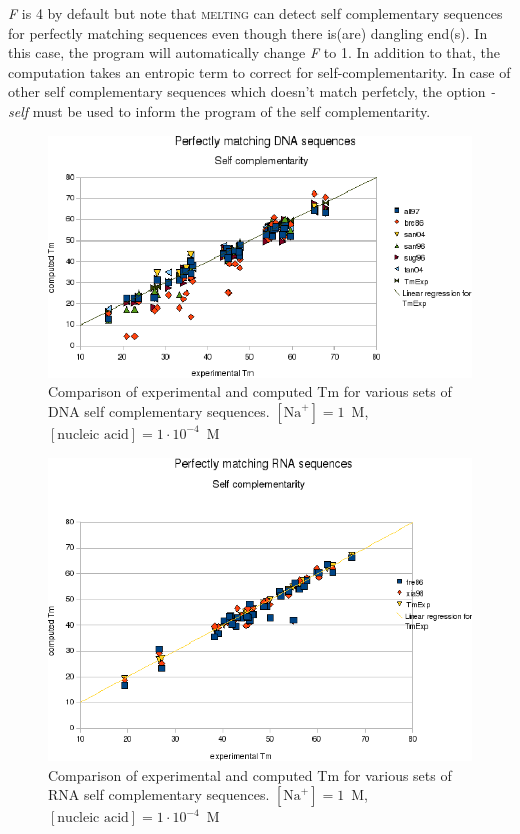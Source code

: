 \documentclass{article}
\begin{document}
\textit{F} is 4 by default but note that \textsc{melting} can detect self complementary sequences 
for perfectly matching sequences even though there is(are) dangling end(s). In this case, the program will 
automatically change \textit{F} to 1. In addition to that, the computation takes an entropic term to correct 
for self-complementarity.
In case of other self complementary sequences which doesn't match perfetcly, the option \textit{-self} must be
used to inform the program of the self complementarity.

\begin{figure}[h]
\includegraphics[width=1\linewidth]{images/DNASelfComplementarity}
\caption{Comparison of experimental and computed Tm for various sets of
 DNA self complementary sequences. $[\mbox{Na}^+] = 1$~M, $[\mbox{nucleic acid}] = 1\cdot{}10^{-4}$~M}
\end{figure} 

\begin{figure}[h]
\includegraphics[width=1\linewidth]{images/RNASelfComplementarity}
\caption{Comparison of experimental and computed Tm for various sets of
 RNA self complementary sequences. $[\mbox{Na}^+] = 1$~M, $[\mbox{nucleic acid}] = 1\cdot{}10^{-4}$~M}
\end{figure}     
  
\end{document}
